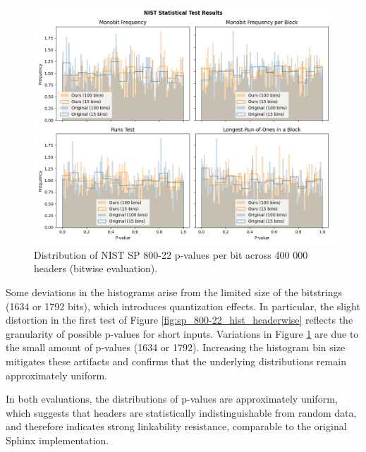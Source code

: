 \begin{figure}[H]
    \centering
    \includegraphics[width=0.9\linewidth]{Images/25-05-19-bitwise_comparison_400000h-20n-3m-3p5.png}
    \caption{Distribution of NIST SP 800-22 p-values per bit across 400 000 headers (bitwise evaluation).}
    \label{fig:sp_800-22_hist_bitwise}
\end{figure}

Some deviations in the histograms arise from the limited size of the bitstrings (1634 or 1792 bits), which introduces quantization effects. 
In particular, the slight distortion in the first test of Figure \ref{fig:sp_800-22_hist_headerwise} reflects the granularity of possible p-values for short inputs. 
Variations in Figure \ref{fig:sp_800-22_hist_bitwise} are due to the small amount of p-values (1634 or 1792).
Increasing the histogram bin size mitigates these artifacts and confirms that the underlying distributions remain approximately uniform.

In both evaluations, the distributions of p-values are approximately uniform, which suggests that headers are statistically indistinguishable from random data, 
and therefore indicates strong linkability resistance, comparable to the original Sphinx implementation.
